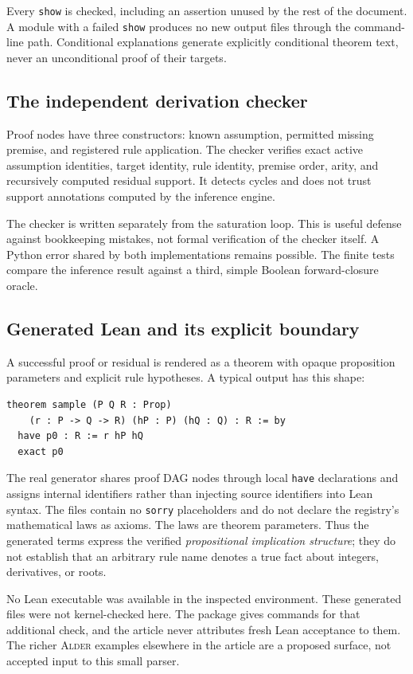 \documentclass[11pt,a4paper]{article}
\newcommand{\code}[1]{\nolinkurl{#1}}
\newcommand{\Alder}{\textsc{Alder}}
\theoremstyle{plain}
\theoremstyle{definition}
\theoremstyle{remark}
\begin{document}
Every \code{show} is checked, including an assertion unused by the rest of the document. A module with a failed \code{show} produces no new output files through the command-line path. Conditional explanations generate explicitly conditional theorem text, never an unconditional proof of their targets.

\subsection{The independent derivation checker}
Proof nodes have three constructors: known assumption, permitted missing premise, and registered rule application. The checker verifies exact active assumption identities, target identity, rule identity, premise order, arity, and recursively computed residual support. It detects cycles and does not trust support annotations computed by the inference engine.

The checker is written separately from the saturation loop. This is useful defense against bookkeeping mistakes, not formal verification of the checker itself. A Python error shared by both implementations remains possible. The finite tests compare the inference result against a third, simple Boolean forward-closure oracle.

\subsection{Generated Lean and its explicit boundary}
A successful proof or residual is rendered as a theorem with opaque proposition parameters and explicit rule hypotheses. A typical output has this shape:
\Needspace{100pt}
\begin{lstlisting}
theorem sample (P Q R : Prop)
    (r : P -> Q -> R) (hP : P) (hQ : Q) : R := by
  have p0 : R := r hP hQ
  exact p0
\end{lstlisting}
The real generator shares proof DAG nodes through local \code{have} declarations and assigns internal identifiers rather than injecting source identifiers into Lean syntax. The files contain no \code{sorry} placeholders and do not declare the registry's mathematical laws as axioms. The laws are theorem parameters. Thus the generated terms express the verified \emph{propositional implication structure}; they do not establish that an arbitrary rule name denotes a true fact about integers, derivatives, or roots.

No Lean executable was available in the inspected environment. These generated files were not kernel-checked here. The package gives commands for that additional check, and the article never attributes fresh Lean acceptance to them. The richer \Alder{} examples elsewhere in the article are a proposed surface, not accepted input to this small parser.
\end{document}
